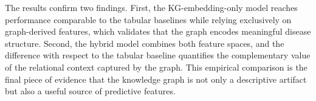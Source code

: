 \documentclass[11pt,a4paper]{article}
\begin{document}
The results confirm two findings. First, the KG-embedding-only model reaches performance comparable to the tabular baselines while relying exclusively on graph-derived features, which validates that the graph encodes meaningful disease structure. Second, the hybrid model combines both feature spaces, and the difference with respect to the tabular baseline quantifies the complementary value of the relational context captured by the graph. This empirical comparison is the final piece of evidence that the knowledge graph is not only a descriptive artifact but also a useful source of predictive features.
\end{document}
